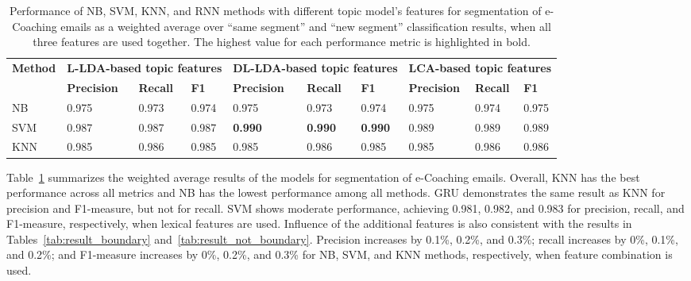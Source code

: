 \documentclass{amia}
\begin{document}
\begin{table}[ht]
\centering
\caption{Performance of NB, SVM, KNN, and RNN methods with different topic model's features for segmentation of e-Coaching emails as a weighted average over ``same segment'' and ``new segment'' classification results, when all three features are used together. The highest value for each performance metric is highlighted in bold.}
\label{tab:result_weighted_avg}
  \begin{tabular}{|l|l|l|l|l|l|l|l|l|l|}
  \hline
   \multirow{2}{*}{\textbf{Method}} & \multicolumn{3}{|c|}{\textbf{L-LDA-based topic features}} & \multicolumn{3}{|c|}{\textbf{DL-LDA-based topic features}}  & \multicolumn{3}{|c|}{\textbf{LCA-based topic features}} \\\cline{2-10} & \textbf{Precision}  & \textbf{Recall} & \textbf{F1} & \textbf{Precision}  & \textbf{Recall} & \textbf{F1} & \textbf{Precision}  & \textbf{Recall} & \textbf{F1}\\ \hline  
    
 NB & 0.975 & 0.973 & 0.974 & 0.975 & 0.973 & 0.974 & 0.975 & 0.974 & 0.975 \\ \hline
 SVM & 0.987 & 0.987 & 0.987 & \textbf{0.990} & \textbf{0.990} & \textbf{0.990} & 0.989 & 0.989 & 0.989 \\ \hline
 KNN & 0.985 & 0.986 & 0.985 & 0.985 & 0.986 & 0.985 & 0.985 & 0.986 & 0.986 \\ \hline
  \end{tabular}
\end{table}         

Table~\ref{tab:result_weighted_avg} summarizes the weighted average results of the models for segmentation of e-Coaching emails. Overall, KNN has the best performance across all metrics and NB has the lowest performance among all methods. GRU demonstrates the same result as KNN for precision and F1-measure, but not for recall. SVM shows moderate performance, achieving 0.981, 0.982, and 0.983 for precision, recall, and F1-measure, respectively, when lexical features are used. Influence of the additional features is also consistent with the results in Tables~\ref{tab:result_boundary} and~\ref{tab:result_not_boundary}. Precision increases by 0.1\%, 0.2\%, and 0.3\%; recall increases by 0\%, 0.1\%, and 0.2\%; and F1-measure increases by 0\%, 0.2\%, and 0.3\% for NB, SVM, and KNN methods, respectively, when feature combination is used.\\
\end{document}
